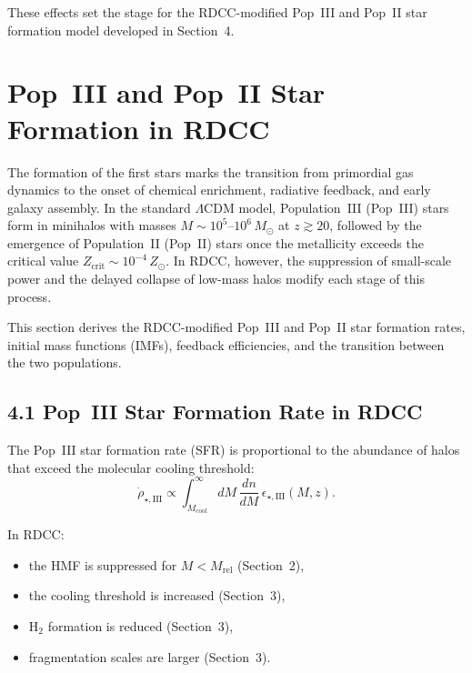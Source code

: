 \documentclass[11pt,a4paper]{article}
\begin{document}
These effects set the stage for the RDCC-modified Pop~III and Pop~II star formation model 
developed in Section~4.

\section{Pop~III and Pop~II Star Formation in RDCC}

The formation of the first stars marks the transition from primordial gas dynamics to the 
onset of chemical enrichment, radiative feedback, and early galaxy assembly. In the standard 
$\Lambda$CDM model, Population~III (Pop~III) stars form in minihalos with masses 
$M \sim 10^{5}$--$10^{6}\,M_{\odot}$ at $z \gtrsim 20$, followed by the emergence of 
Population~II (Pop~II) stars once the metallicity exceeds the critical value 
$Z_{\mathrm{crit}} \sim 10^{-4}\,Z_{\odot}$. In RDCC, however, the suppression of small-scale 
power and the delayed collapse of low-mass halos modify each stage of this process.

This section derives the RDCC-modified Pop~III and Pop~II star formation rates, initial mass 
functions (IMFs), feedback efficiencies, and the transition between the two populations.

\subsection*{4.1 Pop~III Star Formation Rate in RDCC}

The Pop~III star formation rate (SFR) is proportional to the abundance of halos that exceed 
the molecular cooling threshold:
\begin{equation}
    \dot{\rho}_{\star,\mathrm{III}}
    \propto
    \int_{M_{\mathrm{cool}}}^{\infty}
    dM\,
    \frac{dn}{dM}\,
    \epsilon_{\star,\mathrm{III}}(M,z).
\end{equation}

In RDCC:

\begin{itemize}
    \item the HMF is suppressed for $M < M_{\mathrm{rel}}$ (Section~2),
    \item the cooling threshold is increased (Section~3),
    \item $\mathrm{H}_2$ formation is reduced (Section~3),
    \item fragmentation scales are larger (Section~3).
\end{itemize}
\end{document}
